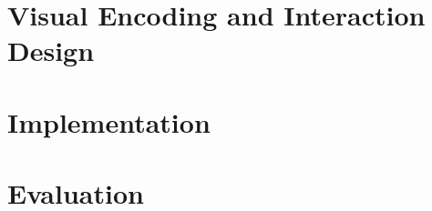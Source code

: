 \documentclass{vgtc}                          %
\begin{document}
\section{Visual Encoding and Interaction Design} %
















\section{Implementation} %


















\section{Evaluation} %
\end{document}
